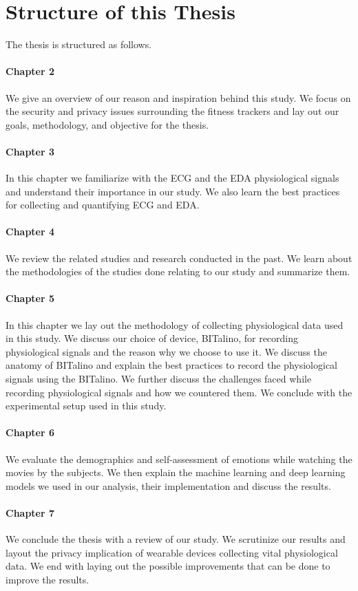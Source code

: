 \section{Structure of this Thesis}
The thesis is structured as follows.
\paragraph{Chapter 2} We give an overview of our reason and inspiration behind this study. We focus on the security and privacy issues surrounding the fitness trackers and lay out our goals, methodology, and objective for the thesis.

\paragraph{Chapter 3} In this chapter we familiarize with the ECG and the EDA physiological signals and understand their importance in our study. We also learn the best practices for collecting and quantifying ECG and EDA.

\paragraph{Chapter 4} We review the related studies and research conducted in the past. We learn about the methodologies of the studies done relating to our study and summarize them.

\paragraph{Chapter 5} In this chapter we lay out the methodology of collecting physiological data used in this study. We discuss our choice of device, BITalino, for recording physiological signals and the reason why we choose to use it. We discuss the anatomy of BITalino and explain the best practices to record the physiological signals using the BITalino. We further discuss the challenges faced while recording physiological signals and how we countered them. We conclude with the experimental setup used in this study.

\paragraph{Chapter 6} We evaluate the demographics and self-assessment of emotions while watching the movies by the subjects. We then explain the machine learning and deep learning models we used in our analysis, their implementation and discuss the results.

\paragraph{Chapter 7} We conclude the thesis with a review of our study. We scrutinize our results and layout the privacy implication of wearable devices collecting vital physiological data. We end with laying out the possible improvements that can be done to improve the results. 